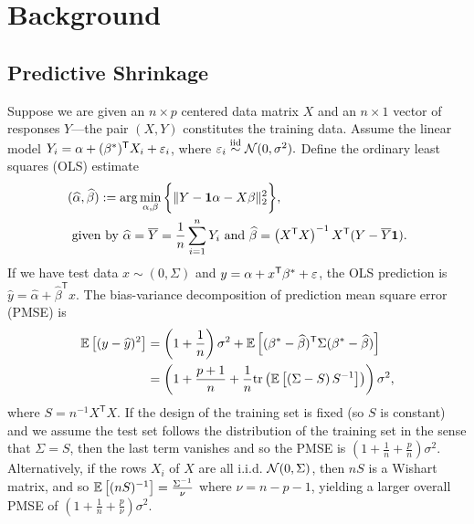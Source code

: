 \documentclass[main]{subfiles}
\begin{document}
\section{Background}

\subsection{Predictive Shrinkage}
\label{sec-background}

Suppose we are given an $n\times p$ centered data matrix $X$ and an $n\times 1$ vector of responses $Y$---the pair $(X,Y)$ constitutes the training data. Assume the linear model $Y_i = \alpha + (\beta^*)^\mathsf{T}X_i + \varepsilon_i$, where  $\varepsilon_i \stackrel{\text{iid}}{\sim} \mathcal{N}(0, \sigma^2).$ Define the ordinary least squares (OLS) estimate
\begin{align}
&(\widehat\alpha,\widehat\beta) := \arg\min_{\alpha,\beta}\bigg\{\|Y - {\bf1}\alpha-X\beta\|_2^2\bigg\}, \\
&\text{ given by }
\widehat\alpha = \overline{Y} = \frac{1}{n}\sum_{i=1}^n Y_i
\text{ and }
\widehat\beta = \left(X^\mathsf{T}X\right)^{-1}X^\mathsf{T}(Y-\overline{Y}{\bf 1}).
\end{align}
If we have test data $x\sim (0, \Sigma)$ and $y = \alpha + x^\mathsf T \beta^* + \varepsilon$, the OLS prediction is $\widehat{y} = \widehat{\alpha} +\widehat\beta^\mathsf{T}x$. The bias-variance decomposition of prediction mean square error (PMSE) is
\begin{align}
\label{eq-bias-variance}
\mathbb{E}\left[ (y - \widehat{y})^2\right]
&= \left(1+\frac{1}{n}\right)\sigma^2 + \mathbb{E}\left[ (\beta^*  -\widehat\beta)^\mathsf T \Sigma (\beta^*  -\widehat\beta)\right]  \\
&= \left(1+\frac{p+1}{n} + \frac{1}{n}\text{tr}\left(  \mathbb{E}\left[(\Sigma-S)\, S^{-1}\right]\right)\right)\sigma^2,
\end{align}
where $S = n^{-1}X^\mathsf{T}X$. If the design of the training set is fixed (so $S$ is constant) and we assume the test set follows the distribution of the training set in the sense that $\Sigma = S$, then the last term vanishes and so the PMSE is $\left(1+\frac{1}{n} + \frac{p}{n}\right)\sigma^2$. Alternatively, if the rows $X_i$ of $X$ are all i.i.d. $\mathcal{N}(0, \Sigma)$, then $nS$ is a Wishart matrix, and so $\mathbb{E}\left[(nS)^{-1}\right] = \frac{\Sigma^{-1}}{\nu}$ where $\nu = n-p-1$, yielding a larger overall PMSE of $\left(1+\frac{1}{n} + \frac{p}{\nu}\right)\sigma^2$. \smallskip
\end{document}
